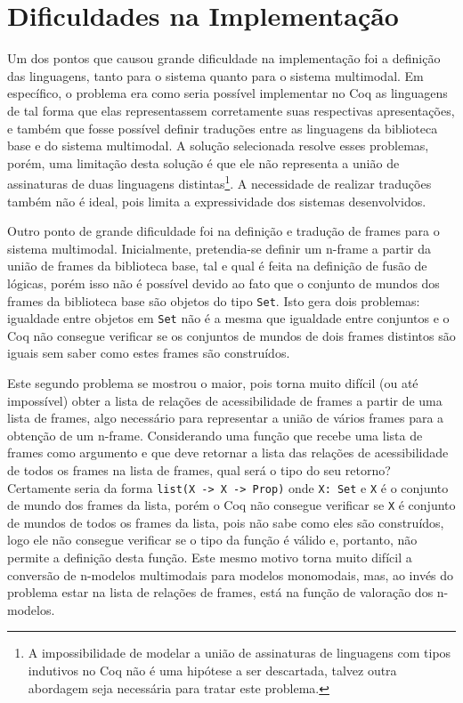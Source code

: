     \section{Dificuldades na Implementação}
      \label{sec:Dificuldades}
      Um dos pontos que causou grande dificuldade na implementação foi a definição das linguagens, tanto para o sistema \SisT quanto para o sistema multimodal.
      Em específico, o problema era como seria possível implementar no Coq as linguagens de tal forma que elas representassem corretamente suas respectivas apresentações,
      e também que fosse possível definir traduções entre as linguagens da biblioteca base e do sistema multimodal. A solução selecionada
      resolve esses problemas, porém, uma limitação desta solução é que ele não representa a união de assinaturas de duas linguagens distintas\footnote{A impossibilidade
      de modelar a união de assinaturas de linguagens com tipos indutivos no Coq não é uma hipótese a ser descartada, talvez outra abordagem seja necessária
      para tratar este problema.}. A necessidade de realizar traduções também não é ideal, pois limita a expressividade dos sistemas desenvolvidos.

      Outro ponto de grande dificuldade foi na definição e tradução de frames para o sistema multimodal. Inicialmente, pretendia-se definir um n-frame a partir
      da união de frames da biblioteca base, tal e qual é feita na definição de fusão de lógicas, porém isso não é possível devido ao fato que o conjunto de mundos
      dos frames da biblioteca base são objetos do tipo \texttt{Set}. Isto gera dois problemas: igualdade entre objetos em \texttt{Set} não é a mesma que igualdade
      entre conjuntos e o Coq não consegue verificar se os conjuntos de mundos de dois frames distintos são iguais sem saber como estes frames são construídos.

      Este segundo problema se mostrou o maior, pois torna muito difícil (ou até impossível) obter a lista de relações de acessibilidade de frames a partir de uma lista de frames,
      algo necessário para representar a união de vários frames para a obtenção de um n-frame. Considerando uma função que recebe uma lista de frames como argumento e
      que deve retornar a lista das relações de acessibilidade de todos os frames na lista de frames, qual será o tipo do seu retorno?
      Certamente seria da forma \texttt{list(X -> X -> Prop)} onde \texttt{X: Set} e \texttt{X} é o conjunto de mundo dos frames da lista, porém o Coq não consegue
      verificar se \texttt{X} é conjunto de mundos de todos os frames da lista, pois não sabe como eles são construídos, logo ele não consegue verificar se o tipo
      da função é válido e, portanto, não permite a definição desta função. Este mesmo motivo torna muito difícil a conversão de n-modelos multimodais para modelos
      monomodais, mas, ao invés do problema estar na lista de relações de frames, está na função de valoração dos n-modelos.

